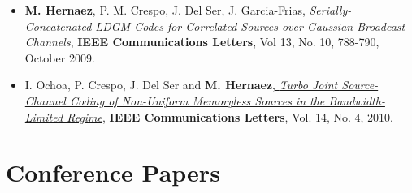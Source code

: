 \documentclass[11pt,a4paper,sans]{moderncv}        %
\begin{document}
\begin{itemize}
\item \textbf{M. Hernaez}, P. M. Crespo, J. {Del Ser}, J. Garcia-Frias, {\emph{ Serially-Concatenated LDGM Codes for Correlated Sources over Gaussian Broadcast Channels}}, \textbf{IEEE Communications Letters}, Vol 13, No. 10, 788-790, October 2009.\\

\item I. Ochoa, P. Crespo, J. Del Ser and \textbf{M. Hernaez},\href{http://web.stanford.edu/~iochoa/publishedPublications/2010_turbo_paper.pdf} {\emph{ Turbo Joint Source-Channel Coding of Non-Uniform Memoryless Sources in the Bandwidth-Limited Regime}}, \textbf{IEEE Communications Letters}, Vol. 14, No. 4, 2010.\\

\end{itemize}

\section{Conference Papers}
\end{document}
